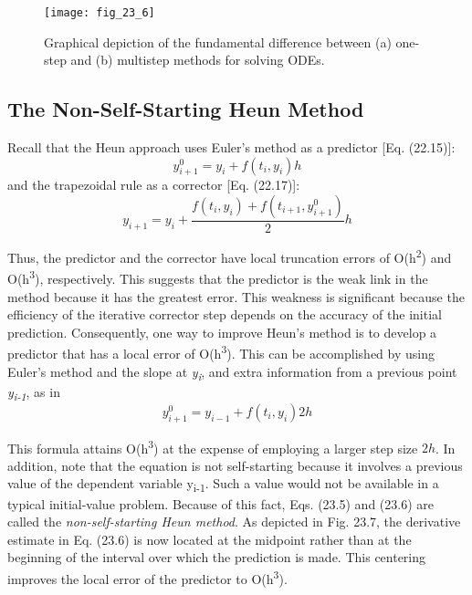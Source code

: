 \documentclass[../main.tex]{subfiles}
\begin{document}
\begin{figure}[H]
    \centering
    \texttt{[image: fig\_23\_6]}
   \caption{\textsf{Graphical depiction of the fundamental difference between (a) one-step and (b) multistep 
   methods for solving ODEs.}}\label{fig:fig_23_6}
\end{figure}

\subsection{The Non-Self-Starting Heun Method}
Recall that the Heun approach uses Euler's method as a predictor [Eq. (22.15)]:
\begin{equation}
    \tag{23.4}
    y_{i+1}^{0}=y_{i}+f\left(t_{i}, y_{i}\right) h
\end{equation}
and the trapezoidal rule as a corrector [Eq. (22.17)]:
\begin{equation}\tag
    {23.5}
    y_{i+1}=y_{i}+\frac{f\left(t_{i}, y_{i}\right)+f\left(t_{i+1}, y_{i+1}^{0}\right)}{2} h
\end{equation}

Thus, the predictor and the corrector have local truncation errors of O(h\textsuperscript{2}) and O(h\textsuperscript{3}),
respectively. This suggests that the predictor is the weak link in the method because it has
the greatest error. This weakness is significant because the efficiency of the iterative corrector step depends on the accuracy of the initial prediction. Consequently, one way to improve Heun's method is to develop a predictor that has a local error of O(h\textsuperscript{3}). This can be accomplished by using Euler's method and the slope at \textit{y\textsubscript{i}}, and extra information from a previous point \textit{y\textsubscript{i-1}}, as in
\begin{equation}
    \tag{23.6}
    y_{i+1}^{0}=y_{i-1}+f\left(t_{i}, y_{i}\right) 2 h
\end{equation}

\noindent This formula attains O(h\textsuperscript{3}) at the expense of employing a larger step size $2h$. In addition,
note that the equation is not self-starting because it involves a previous value of the dependent variable y\textsubscript{i-1}. Such a value would not be available in a typical initial-value problem.
Because of this fact, Eqs. (23.5) and (23.6) are called the \textit{non-self-starting Heun method}.
As depicted in Fig. 23.7, the derivative estimate in Eq. (23.6) is now located at the midpoint
rather than at the beginning of the interval over which the prediction is made. This centering improves the local error of the predictor to O(h\textsuperscript{3}).
\end{document}
